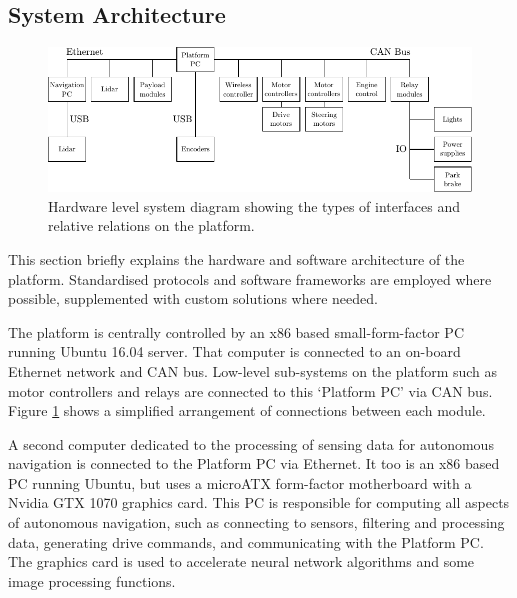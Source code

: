 \documentclass[preprint,authoryear,12pt]{elsarticle}
\begin{document}
    \subsection{System Architecture}
    \label{sect:architecture}

        \begin{figure}[htb]
            \centering
            \includegraphics[width=\linewidth]{imgs/system_diagram/diagram_v3.pdf}
            \caption{Hardware level system diagram showing the types of interfaces and relative relations on the platform.}
            \label{fig:system_diagram}
        \end{figure}

        This section briefly explains the hardware and software architecture of the platform.
        Standardised protocols and software frameworks are employed where possible, supplemented with custom solutions where needed.

        The platform is centrally controlled by an x86 based small-form-factor PC running Ubuntu 16.04 server.
        That computer is connected to an on-board Ethernet network and CAN bus.
        Low-level sub-systems on the platform such as motor controllers and relays are connected to this `Platform PC' via CAN bus.
        Figure \ref{fig:system_diagram} shows a simplified arrangement of connections between each module.

        A second computer dedicated to the processing of sensing data for autonomous navigation is connected to the Platform PC via Ethernet.
        It too is an x86 based PC running Ubuntu, but uses a microATX form-factor motherboard with a Nvidia GTX 1070 graphics card.
        This PC is responsible for computing all aspects of autonomous navigation, such as connecting to sensors, filtering and processing data, generating drive commands, and communicating with the Platform PC.
        The graphics card is used to accelerate neural network algorithms and some image processing functions.
\end{document}
